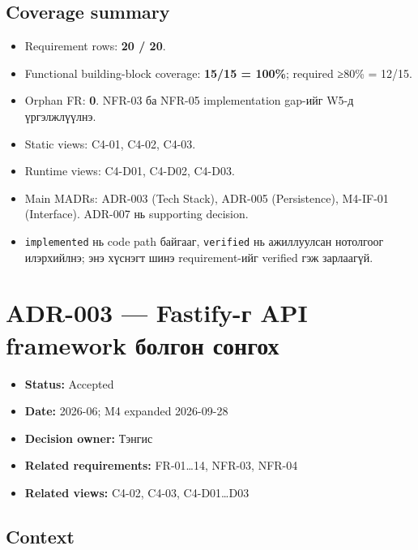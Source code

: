 \documentclass[
  mongolian,
]{article}
\providecommand{\tightlist}{%
  \setlength{\itemsep}{0pt}\setlength{\parskip}{0pt}}
\begin{document}
\endgroup

\subsection{Coverage summary}\label{coverage-summary}

\begin{itemize}
\tightlist
\item
  Requirement rows: \textbf{20 / 20}.
\item
  Functional building-block coverage: \textbf{15/15 = 100\%}; required
  ≥80\% = 12/15.
\item
  Orphan FR: \textbf{0}. NFR-03 ба NFR-05 implementation gap-ийг W5-д
  үргэлжлүүлнэ.
\item
  Static views: C4-01, C4-02, C4-03.
\item
  Runtime views: C4-D01, C4-D02, C4-D03.
\item
  Main MADRs: ADR-003 (Tech Stack), ADR-005 (Persistence), M4-IF-01
  (Interface). ADR-007 нь supporting decision.
\item
  \texttt{implemented} нь code path байгааг, \texttt{verified} нь
  ажиллуулсан нотолгоог илэрхийлнэ; энэ хүснэгт шинэ requirement-ийг
  verified гэж зарлаагүй.
\end{itemize}

\newpage

\section{ADR-003 --- Fastify-г API framework болгон
сонгох}\label{adr-003-fastify-ux433-api-framework-ux431ux43eux43bux433ux43eux43d-ux441ux43eux43dux433ux43eux445}

\begin{itemize}
\tightlist
\item
  \textbf{Status:} Accepted
\item
  \textbf{Date:} 2026-06; M4 expanded 2026-09-28
\item
  \textbf{Decision owner:} Тэнгис
\item
  \textbf{Related requirements:} FR-01\ldots14, NFR-03, NFR-04
\item
  \textbf{Related views:} C4-02, C4-03, C4-D01\ldots D03
\end{itemize}

\subsection{Context}\label{context}
\end{document}
